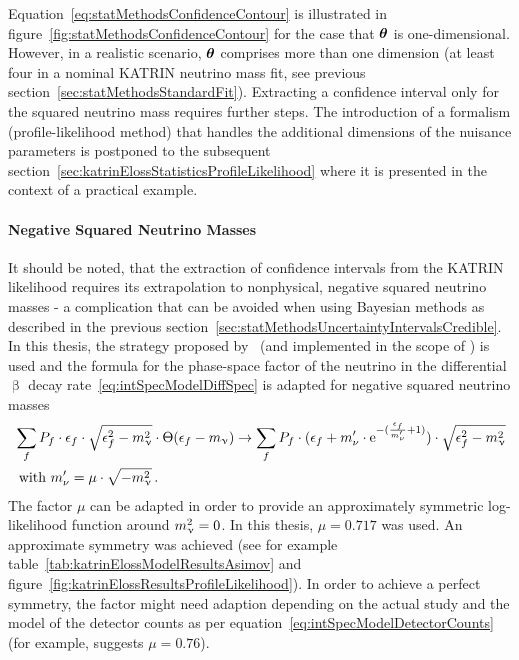 Equation~\eqref{eq:statMethodsConfidenceContour} is illustrated in figure~\ref{fig:statMethodsConfidenceContour} for the case that $\boldsymbol{\mathbf{\theta}}$ is one-dimensional. However, in a realistic scenario, $\boldsymbol{\mathbf{\theta}}$ comprises more than one dimension (at least four in a nominal KATRIN neutrino mass fit, see previous section~\ref{sec:statMethodsStandardFit}). Extracting a confidence interval only for the squared neutrino mass requires further steps. The introduction of a formalism (profile-likelihood method) that handles the additional dimensions of the nuisance parameters is postponed to the subsequent section~\ref{sec:katrinElossStatisticsProfileLikelihood} where it is presented in the context of a practical example.

\paragraph{Negative Squared Neutrino Masses}
It should be noted, that the extraction of confidence intervals from the KATRIN likelihood requires its extrapolation to nonphysical, negative squared neutrino masses - a complication that can be avoided when using Bayesian methods as described in the previous section~\ref{sec:statMethodsUncertaintyIntervalsCredible}. In this thesis, the strategy proposed by~\cite{WEINHEIMER1993} (and implemented in the scope of \cite{Kleesiek2014}) is used and the formula for the phase-space factor of the neutrino in the differential $\upbeta$ decay rate~\eqref{eq:intSpecModelDiffSpec} is adapted for negative squared neutrino masses
\begin{equation}
\begin{split}
&\sum_{f} 
P_f \cdot 
\epsilon_f \cdot 
\sqrt{\epsilon_f^2-m_\upnu^2} \cdot 
\Theta(\epsilon_f-m_\upnu)
\rightarrow
\sum_{f} 
P_f \cdot 
(
	\epsilon_f + 
	m_\nu^\prime\cdot 
	\mathrm{e}^{-(\frac{\epsilon_f}{m_\nu^\prime}+1)}	
) \cdot 
\sqrt{\epsilon_f^2-m_\upnu^2} \\
&\text{ with } m_\nu^\prime = \mu \cdot \sqrt{-m_\upnu^2}
\text{\,.}
\end{split}
\end{equation}
The factor $\mu$ can be adapted in order to provide an approximately symmetric log-likelihood function around $m_\upnu^2=0$. In this thesis, $\mu=0.717$ was used. An approximate symmetry was achieved (see for example table~\ref{tab:katrinElossModelResultsAsimov} and figure~\ref{fig:katrinElossResultsProfileLikelihood}). In order to achieve a perfect symmetry, the factor might need adaption depending on the actual study and the model of the detector counts as per equation~\eqref{eq:intSpecModelDetectorCounts} (for example, \cite{WEINHEIMER1993} suggests $\mu=0.76$).

